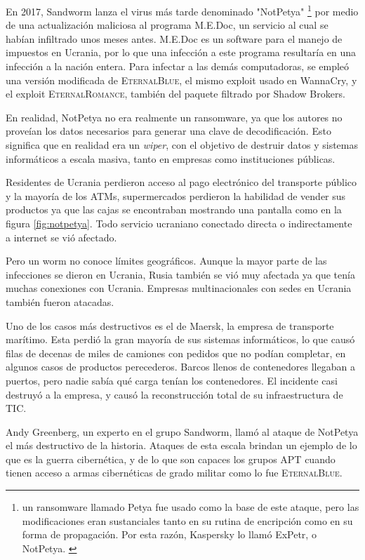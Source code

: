 \documentclass{article}
\begin{document}
En 2017, Sandworm lanza el virus más tarde denominado "NotPetya" \footnote{un ransomware llamado Petya fue usado como la base de este ataque, pero las modificaciones eran sustanciales tanto en su rutina de encripción como en su forma de propagación. Por esta razón, Kaspersky lo llamó ExPetr, o NotPetya. \autocite{kaspersky-notpetya}} por medio de una actualización maliciosa al programa M.E.Doc, un servicio al cual se habían infiltrado unos meses antes. M.E.Doc es un software para el manejo de impuestos en Ucrania, por lo que una infección a este programa resultaría en una infección a la nación entera. Para infectar a las demás computadoras, se empleó una versión modificada de \textsc{EternalBlue}, el mismo exploit usado en WannaCry, y el exploit \textsc{EternalRomance}, también del paquete filtrado por Shadow Brokers.

En realidad, NotPetya no era realmente un ransomware, ya que los autores no proveían los datos necesarios para generar una clave de decodificación. Esto significa que en realidad era un {\it wiper}, con el objetivo de destruir datos y sistemas informáticos a escala masiva, tanto en empresas como instituciones públicas.

Residentes de Ucrania perdieron acceso al pago electrónico del transporte público y la mayoría de los ATMs, supermercados perdieron la habilidad de vender sus productos ya que las cajas se encontraban mostrando una pantalla como en la figura \ref{fig:notpetya}. Todo servicio ucraniano conectado directa o indirectamente a internet se vió afectado.

Pero un worm no conoce límites geográficos. Aunque la mayor parte de las infecciones se dieron en Ucrania, Rusia también se vió muy afectada ya que tenía muchas conexiones con Ucrania. Empresas multinacionales con sedes en Ucrania también fueron atacadas. \autocite{securelist-notpetya}

Uno de los casos más destructivos es el de Maersk, la empresa de transporte marítimo. Esta perdió la gran mayoría de sus sistemas informáticos, lo que causó filas de decenas de miles de camiones con pedidos que no podían completar, en algunos casos de productos perecederos. Barcos llenos de contenedores llegaban a puertos, pero nadie sabía qué carga tenían los contenedores. El incidente casi destruyó a la empresa, y causó la reconstrucción total de su infraestructura de TIC. \autocite{darknetdiaries-notpetya}

Andy Greenberg, un experto en el grupo Sandworm, llamó al ataque de NotPetya el más destructivo de la historia. Ataques de esta escala brindan un ejemplo de lo que es la guerra cibernética, y de lo que son capaces los grupos APT cuando tienen acceso a armas cibernéticas de grado militar como lo fue \textsc{EternalBlue}. \autocite{wired-notpetya} \autocite{greenberg-sandworm} 
\end{document}
